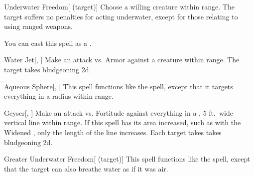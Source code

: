 \lowercase{\hypertarget{spell:Underwater Freedom}{}}\label{spell:Underwater Freedom}
\begin{attuneability}[\nth{1}]{\hypertarget{spell:Underwater Freedom}{Underwater Freedom}}[ (target)]
Choose a willing creature within \rngclose range.
The target suffers no penalties for acting underwater, except for those relating to using ranged weapons.

You can cast this spell as a .
\end{attuneability}
\vspace{0.25em}



\lowercase{\hypertarget{spell:Water Jet}{}}\label{spell:Water Jet}
\begin{apability}[\nth{1}]{\hypertarget{spell:Water Jet}{Water Jet}}[, ]
Make an attack vs. Armor against a creature within \rngclose range.
\hit The target takes bludgeoning  \plus2d.
\end{apability}
\vspace{0.25em}



\lowercase{\hypertarget{spell:Aqueous Sphere}{}}\label{spell:Aqueous Sphere}
\begin{apability}[\nth{2}]{\hypertarget{spell:Aqueous Sphere}{Aqueous Sphere}}[, ]
This spell functions like the  spell, except that it targets everything in a \areasmall radius within \rngmed range.
\end{apability}
\vspace{0.25em}



\lowercase{\hypertarget{spell:Geyser}{}}\label{spell:Geyser}
\begin{apability}[\nth{2}]{\hypertarget{spell:Geyser}{Geyser}}[, ]
Make an attack vs. Fortitude against everything in a \arealarge, 5 ft.\ wide vertical line within \rngmed range.
If this spell has its area increased, such as with the Widened , only the length of the line increases.
\hit Each target takes takes bludgeoning  \plus2d.
\end{apability}
\vspace{0.25em}



\lowercase{\hypertarget{spell:Greater Underwater Freedom}{}}\label{spell:Greater Underwater Freedom}
\begin{attuneability}[\nth{3}]{\hypertarget{spell:Greater Underwater Freedom}{Greater Underwater Freedom}}[ (target)]
This spell functions like the  spell, except that the target can also breathe water as if it was air.
\end{attuneability}
\vspace{0.25em}



